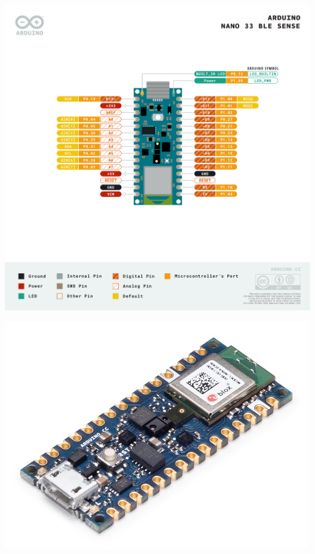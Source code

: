 \documentclass{article}
\begin{document}
\includegraphics[width=\linewidth]{img/Pinout-NANOsense_latest.png}

\includegraphics[width=\linewidth]{img/abx00031_iso_1.jpg}
\end{document}
